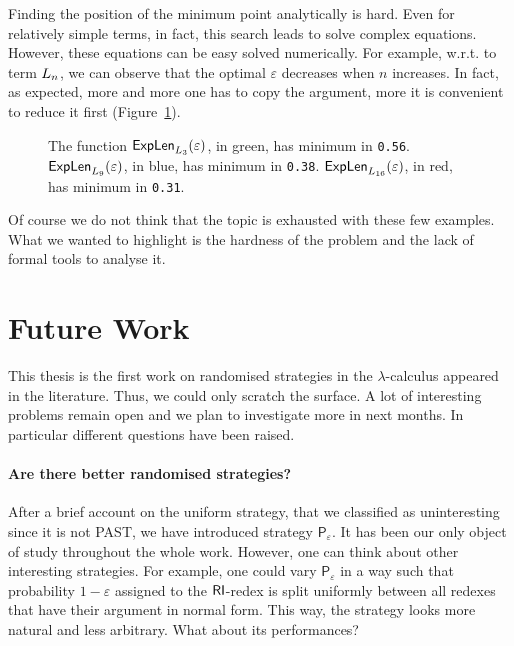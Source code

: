Finding the position of the minimum point analytically is hard. Even for relatively simple terms, in fact, this search leads to solve complex equations. However, these equations can be easy solved numerically. For example, w.r.t. to term $L_n$, we can observe that the optimal $\varepsilon$ decreases when $n$ increases. In fact, as expected, more and more one has to copy the argument, more it is convenient to reduce it first (Figure~\ref{figure:plot3}).
\begin{figure}
		\caption[The function $\explen{\termthree_3}(\varepsilon)$.]{The function $\explen{\termthree_3}(\varepsilon)$, in green, has minimum in \texttt{0.56}. $\textsf{ExpLen}_{L_9}(\varepsilon)$, in blue, has minimum in \texttt{0.38}. $\textsf{ExpLen}_{L_{16}}(\varepsilon)$, in red, has minimum in \texttt{0.31}.}
		\label{figure:plot3}
	\end{figure}
	 Of course we do not think that the topic is exhausted with these few examples. What we wanted to highlight is the hardness of the problem and the lack of formal tools to analyse it.
\section{Future Work}
This thesis is the first work on randomised strategies in the $\lambda$-calculus appeared in the literature. Thus, we could only scratch the surface. A lot of interesting problems remain open and we plan to investigate more in next months. In particular different questions have been raised.
\paragraph{Are there better randomised strategies?} After a brief account on the uniform strategy, that we classified as uninteresting since it is not PAST, we have introduced strategy $\mathsf{P}_\varepsilon$. It has been our only object of study throughout the whole work. However, one can think about other interesting strategies. For example, one could vary $\mathsf{P}_\varepsilon$ in a way such that probability $1-\varepsilon$ assigned to the $\textsf{RI}$-redex is split uniformly between all redexes that have their argument in normal form. This way, the strategy looks more natural and less arbitrary. What about its performances?
